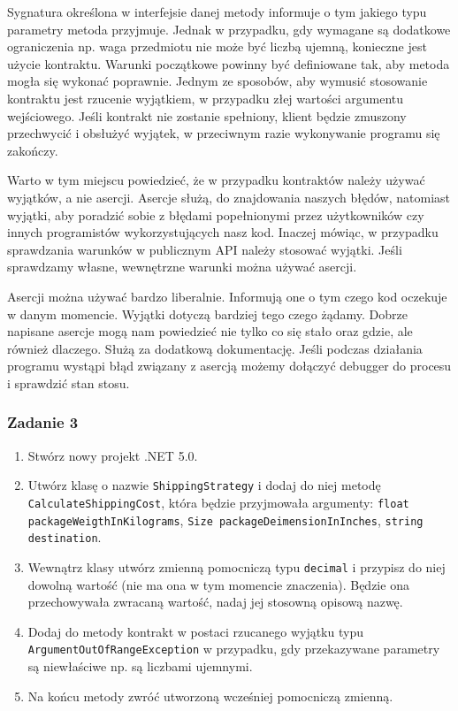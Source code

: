 Sygnatura określona w interfejsie danej metody informuje o tym jakiego typu parametry metoda przyjmuje. Jednak w przypadku, gdy wymagane są dodatkowe ograniczenia np. waga przedmiotu nie może być liczbą ujemną, konieczne jest użycie kontraktu. Warunki początkowe powinny być definiowane tak, aby metoda mogła się wykonać poprawnie. Jednym ze sposobów, aby wymusić stosowanie kontraktu jest rzucenie wyjątkiem, w przypadku złej wartości argumentu wejściowego. Jeśli kontrakt nie zostanie spełniony, klient będzie zmuszony przechwycić i obsłużyć wyjątek, w przeciwnym razie wykonywanie programu się zakończy.

Warto w tym miejscu powiedzieć, że w przypadku kontraktów należy używać wyjątków, a nie asercji. Asercje służą, do znajdowania naszych błędów, natomiast wyjątki, aby poradzić sobie z błędami popełnionymi przez użytkowników czy innych programistów wykorzystujących nasz kod. Inaczej mówiąc, w przypadku sprawdzania warunków w publicznym API należy stosować wyjątki. Jeśli sprawdzamy własne, wewnętrzne warunki można używać asercji.

Asercji można używać bardzo liberalnie. Informują one o tym czego kod oczekuje w danym momencie. Wyjątki dotyczą bardziej tego czego żądamy. Dobrze napisane asercje mogą nam powiedzieć nie tylko co się stało oraz gdzie, ale również dlaczego. Służą za dodatkową dokumentację. Jeśli podczas działania programu wystąpi błąd związany z asercją możemy dołączyć debugger do procesu i sprawdzić stan stosu. 

\subsubsection{Zadanie 3}
\begin{enumerate}
	\item Stwórz nowy projekt .NET 5.0.
	\item Utwórz klasę o nazwie \texttt{ShippingStrategy} i dodaj do niej metodę \texttt{CalculateShippingCost}, która będzie przyjmowała argumenty: \texttt{float packageWeigthInKilograms}, \texttt{Size packageDeimensionInInches}, \texttt{string destination}.
	\item Wewnątrz klasy utwórz zmienną pomocniczą typu \texttt{decimal} i przypisz do niej dowolną wartość (nie ma ona w tym momencie znaczenia). Będzie ona przechowywała zwracaną wartość, nadaj jej stosowną opisową nazwę.
	\item Dodaj do metody kontrakt w postaci rzucanego wyjątku typu \texttt{ArgumentOutOfRangeException} w przypadku, gdy przekazywane parametry są niewłaściwe np. są liczbami ujemnymi.
	\item Na końcu metody zwróć utworzoną wcześniej pomocniczą zmienną.
\end{enumerate}

